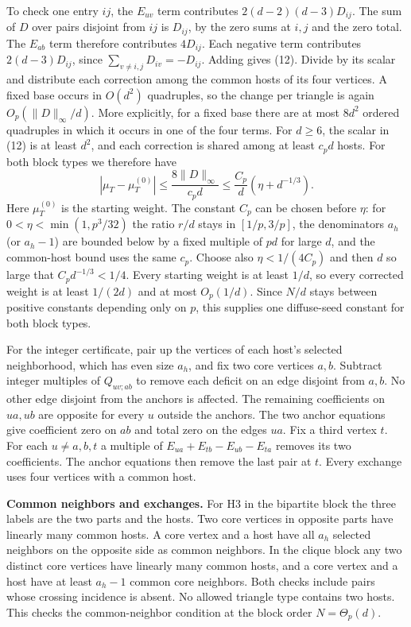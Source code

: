 \documentclass[english,11pt,a4paper]{article}
\begin{document}
To check one entry \(ij\), the \(E_{uv}\) term contributes \(2(d-2)(d-3)D_{ij}\). The sum of \(D\) over pairs disjoint from \(ij\) is \(D_{ij}\), by the zero sums at \(i,j\) and the zero total. The \(E_{ab}\) term therefore contributes \(4D_{ij}\). Each negative term contributes \(2(d-3)D_{ij}\), since \(\sum_{v\ne i,j}D_{iv}=-D_{ij}\). Adding gives (12). Divide by its scalar and distribute each correction among the common hosts of its four vertices. A fixed base occurs in \(O(d^2)\) quadruples, so the change per triangle is again \(O_p(\|D\|_\infty/d)\). More explicitly, for a fixed base there are at most \(8d^2\) ordered quadruples in which it occurs in one of the four terms. For \(d\ge6\), the scalar in (12) is at least \(d^2\), and each correction is shared among at least \(c_pd\) hosts. For both block types we therefore have \[|\mu_T-\mu_T^{(0)}|\le \frac{8\|D\|_\infty}{c_pd}
 \le \frac{C_p}{d}(\eta+d^{-1/3}).\] Here \(\mu_T^{(0)}\) is the starting weight. The constant \(C_p\) can be chosen before \(\eta\): for \(0<\eta<\min(1,p^3/32)\) the ratio \(r/d\) stays in \([1/p,3/p]\), the denominators \(a_h\) (or \(a_h-1\)) are bounded below by a fixed multiple of \(pd\) for large \(d\), and the common-host bound uses the same \(c_p\). Choose also \(\eta<1/(4C_p)\) and then \(d\) so large that \(C_pd^{-1/3}<1/4\). Every starting weight is at least \(1/d\), so every corrected weight is at least \(1/(2d)\) and at most \(O_p(1/d)\). Since \(N/d\) stays between positive constants depending only on \(p\), this supplies one diffuse-seed constant for both block types.

For the integer certificate, pair up the vertices of each host's selected neighborhood, which has even size \(a_h\), and fix two core vertices \(a,b\). Subtract integer multiples of \(Q_{uv;ab}\) to remove each deficit on an edge disjoint from \(a,b\). No other edge disjoint from the anchors is affected. The remaining coefficients on \(ua,ub\) are opposite for every \(u\) outside the anchors. The two anchor equations give coefficient zero on \(ab\) and total zero on the edges \(ua\). Fix a third vertex \(t\). For each \(u\ne a,b,t\) a multiple of \(E_{ua}+E_{tb}-E_{ub}-E_{ta}\) removes its two coefficients. The anchor equations then remove the last pair at \(t\). Every exchange uses four vertices with a common host.

\textbf{Common neighbors and exchanges.} For H3 in the bipartite block the three labels are the two parts and the hosts. Two core vertices in opposite parts have linearly many common hosts. A core vertex and a host have all \(a_h\) selected neighbors on the opposite side as common neighbors. In the clique block any two distinct core vertices have linearly many common hosts, and a core vertex and a host have at least \(a_h-1\) common core neighbors. Both checks include pairs whose crossing incidence is absent. No allowed triangle type contains two hosts. This checks the common-neighbor condition at the block order \(N=\Theta_p(d)\).
\end{document}
